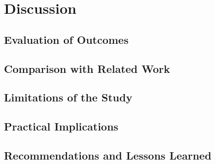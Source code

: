 \chapter{Discussion}\label{ch:discussion}

\section{Evaluation of Outcomes} %

\section{Comparison with Related Work}

\section{Limitations of the Study}

\section{Practical Implications}

\section{Recommendations and Lessons Learned}
